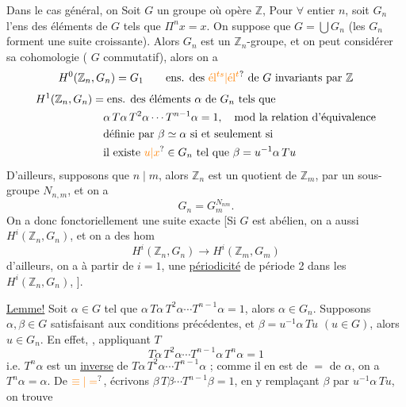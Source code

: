 Dans le cas général, on 
Soit $G$ un groupe où opère $\mathbb Z$,  Pour $\forall$ entier $n$, soit $G_n$ l'ens des éléments de $G$ tels que $\Pi^n x=x$.
On suppose que $G=\bigcup G_n$ (les $G_n$ forment une suite croissante). Alors $G_n$ est un $\mathbb Z_n$-groupe, et on peut considérer sa cohomologie  ( $G$ commutatif), alors on a
\[
H^0(\mathbb Z_n,G_n)=G_1\qquad\text{ens. des \unsure{él$^{ts}$|él$^t$} de $G$ invariants par $\mathbb Z$}
\]
\[
\begin{aligned}
H^1(\mathbb Z_n,G_n)&=\text{ens. des éléments $\alpha$ de $G_n$ tels que}\\
&\quad\alpha\,T\alpha\,T^2\alpha\cdots T^{n-1}\alpha=1,\quad\text{mod la relation d'équivalence}\\
&\quad\text{définie par }\beta\simeq\alpha\text{ si et seulement si}\\
&\quad\text{il existe }\unsure{u|x}\in G_n\text{ tel que }\beta=u^{-1}\alpha\,Tu
\end{aligned}
\]
D'ailleurs, supposons que $n\mid m$, alors $\mathbb Z_n$ est un quotient de $\mathbb Z_m$,  par un sous-groupe $N_{n,m}$, et on a
\[
\boxed{G_n=G_m^{N_{nm}}}.
\]
On a donc fonctoriellement une suite exacte
[Si  $G$ est abélien, on a aussi $H^i(\mathbb Z_n,G_n)$, et on a des hom
\[
H^i(\mathbb Z_n,G_n)\longrightarrow H^i(\mathbb Z_m,G_m)
\]
d'ailleurs, on a à partir de $i=1$, une \uline{périodicité} de période 2 dans les $H^i(\mathbb Z_n,G_n)$,  ].

\uline{Lemme!} Soit $\alpha\in G$ tel que $\alpha\,T\alpha\,T^2\alpha\cdots T^{n-1}\alpha=1$, alors $\alpha\in G_n$.
Supposons $\alpha,\beta\in G$ satisfaisant aux conditions précédentes, et $\beta=u^{-1}\alpha\,Tu$ $(u\in G)$, alors $u\in G_n$.
En effet, , appliquant $T$ \deleted{$\unsure{\cdot}$}
\[
T\alpha\,T^2\alpha\cdots T^{n-1}\alpha\,T^n\alpha=1
\]
i.e. $T^n\alpha$ est un \uline{inverse}  de $T\alpha\,T^2\alpha\cdots T^{n-1}\alpha$ ; comme il en est de $=$ de $\alpha$, on a $T^n\alpha=\alpha$.
De $\unsure{\equiv|=}$, écrivons $\beta\,T\beta\cdots T^{n-1}\beta=1$, en y remplaçant $\beta$ par $u^{-1}\alpha\,Tu$, on trouve


